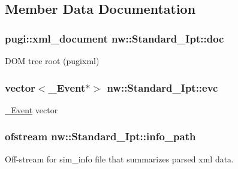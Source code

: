 \subsection{Member Data Documentation}
\hypertarget{classnw_1_1_standard___ipt_a08140c2c24ab36240c45d241352fc57d}{
\subsubsection[{doc}]{\setlength{\rightskip}{0pt plus 5cm}pugi\+::xml\+\_\+document nw\+::\+Standard\+\_\+\+Ipt\+::doc\hspace{0.3cm}{\ttfamily [private]}}}\label{classnw_1_1_standard___ipt_a08140c2c24ab36240c45d241352fc57d}


D\+O\+M tree root (pugixml) 

\hypertarget{classnw_1_1_standard___ipt_aed79f0ae61a44f1d3aceb6839a8a7733}{
\subsubsection[{evc}]{\setlength{\rightskip}{0pt plus 5cm}vector$<${\bf \+\_\+\+Event}$\ast$$>$ nw\+::\+Standard\+\_\+\+Ipt\+::evc\hspace{0.3cm}{\ttfamily [private]}}}\label{classnw_1_1_standard___ipt_aed79f0ae61a44f1d3aceb6839a8a7733}


\hyperlink{classnw_1_1___event}{\+\_\+\+Event} vector 

\hypertarget{classnw_1_1_standard___ipt_a7b8147e8b90f4adabb30e1b3fd8c40b8}{
\subsubsection[{info\+\_\+path}]{\setlength{\rightskip}{0pt plus 5cm}ofstream nw\+::\+Standard\+\_\+\+Ipt\+::info\+\_\+path\hspace{0.3cm}{\ttfamily [private]}}}\label{classnw_1_1_standard___ipt_a7b8147e8b90f4adabb30e1b3fd8c40b8}


Off-\/stream for sim\+\_\+info file that summarizes parsed xml data. 

